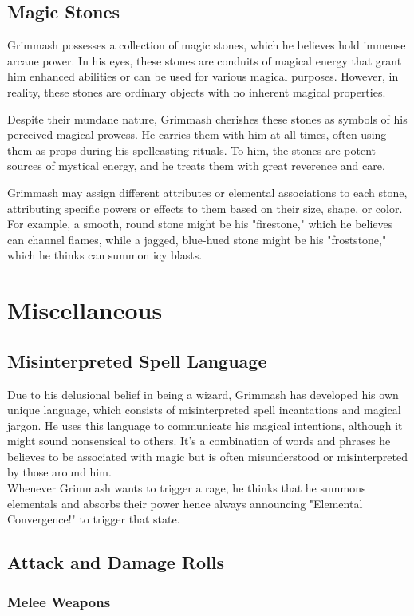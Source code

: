 \documentclass[letterpaper,openany,oneside,twocolumn]{book}
\begin{document}
\subsection*{Magic Stones}
Grimmash possesses a collection of magic stones, which he believes hold immense arcane power. In his eyes, these stones are conduits of magical energy that grant him enhanced abilities or can be used for various magical purposes. However, in reality, these stones are ordinary objects with no inherent magical properties.

Despite their mundane nature, Grimmash cherishes these stones as symbols of his perceived magical prowess. He carries them with him at all times, often using them as props during his spellcasting rituals. To him, the stones are potent sources of mystical energy, and he treats them with great reverence and care.

Grimmash may assign different attributes or elemental associations to each stone, attributing specific powers or effects to them based on their size, shape, or color. For example, a smooth, round stone might be his "firestone," which he believes can channel flames, while a jagged, blue-hued stone might be his "froststone," which he thinks can summon icy blasts.

\section*{Miscellaneous}
\subsection*{Misinterpreted Spell Language}
Due to his delusional belief in being a wizard, Grimmash has developed his own unique language, which consists of misinterpreted spell incantations and magical jargon. He uses this language to communicate his magical intentions, although it might sound nonsensical to others. It's a combination of words and phrases he believes to be associated with magic but is often misunderstood or misinterpreted by those around him.\\
Whenever Grimmash wants to trigger a rage, he thinks that he summons elementals and absorbs their power hence always announcing "Elemental Convergence!" to trigger that state.

\subsection*{Attack and Damage Rolls}
\subsubsection*{Melee Weapons}
\end{document}
